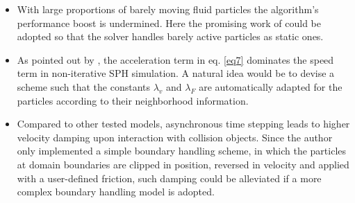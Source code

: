 \documentclass[
	11pt, 
	DIV10,
	ngerman,
	a4paper, 
	oneside, 
	headings=normal, 
	captions=tableheading,
	final, 
	numbers=noenddot
]{scrartcl}
\begin{document}
\begin{itemize}
    \item With large proportions of barely moving fluid particles the algorithm's performance boost is undermined. Here the promising work of \cite{goswami2014regional} could be adopted so that the solver handles barely active particles as static ones.
    \item As pointed out by \cite{bender2010boundary}, the acceleration term in eq. \ref{eq7} dominates the speed term in non-iterative SPH simulation. A natural idea would be to devise a scheme such that the constants $ \lambda_{v} $ and $ \lambda_{F} $ are automatically adapted for the particles according to their neighborhood information.
    \item Compared to other tested models, asynchronous time stepping leads to higher velocity damping upon interaction with collision objects. Since the author only implemented a simple boundary handling scheme, in which the particles at domain boundaries are clipped in position, reversed in velocity and applied with a user-defined friction, such damping could be alleviated if a more complex boundary handling model is adopted.
\end{itemize}



\end{document}
